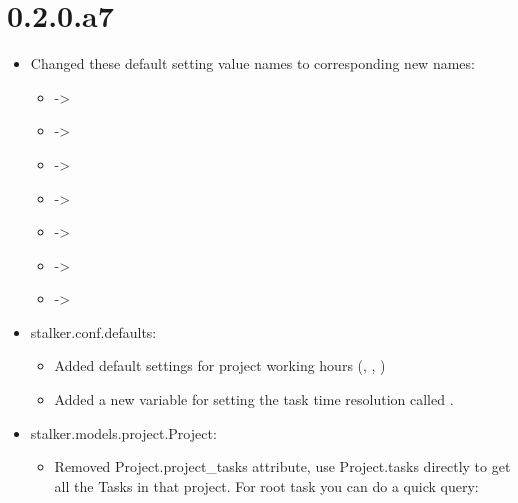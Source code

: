 \documentclass[a4paper,10pt,english]{sphinxmanual}
\begin{document}
\section{0.2.0.a7}
\label{changelog:a7}\begin{itemize}
\item {} 
Changed these default setting value names to corresponding new names:
\begin{itemize}
\item {} 
 -\textgreater{} 

\item {} 
 -\textgreater{} 

\item {} 
 -\textgreater{} 

\item {} 
 -\textgreater{} 

\item {} 
 -\textgreater{} 

\item {} 
 -\textgreater{} 

\item {} 
 -\textgreater{} 

\end{itemize}

\item {} 
stalker.conf.defaults:
\begin{itemize}
\item {} 
Added default settings for project working hours (,
, )

\item {} 
Added a new variable for setting the task time resolution called
.

\end{itemize}

\item {} 
stalker.models.project.Project:
\begin{itemize}
\item {} 
Removed Project.project\_tasks attribute, use Project.tasks directly to get
all the Tasks in that project. For root task you can do a quick query:


\end{itemize}
\end{itemize}
\end{document}
